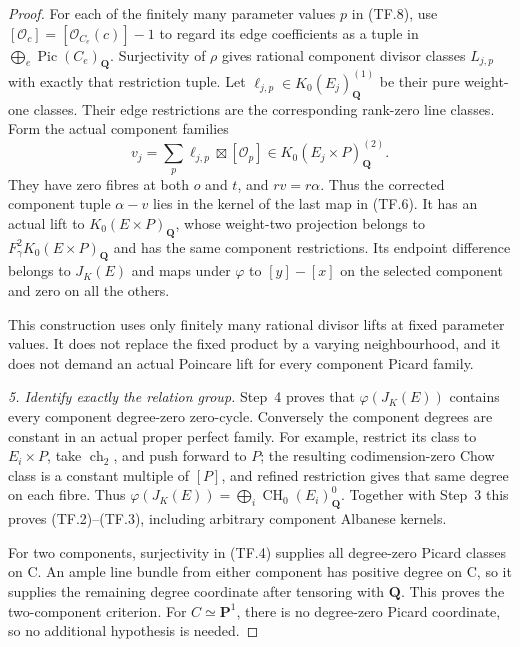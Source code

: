 \begin{proof}
For each of the finitely many parameter values $p$ in (TF.8), use
$[\mathcal O_c]=[\mathcal O_{C_e}(c)]-1$ to regard its edge
coefficients as a tuple in $\bigoplus_e\operatorname{Pic}(C_e)_{\mathbf Q}$.
Surjectivity of $\rho$ gives rational component divisor classes
$L_{j,p}$ with exactly that restriction tuple.
Let $\ell_{j,p}\in K_0(E_j)_{\mathbf Q}^{(1)}$ be their pure
weight-one classes. Their edge restrictions are the corresponding
rank-zero line classes. Form the actual component families
\begin{equation}
 v_j=\sum_p\ell_{j,p}\boxtimes[\mathcal O_p]
            \in K_0(E_j\times P)_{\mathbf Q}^{(2)}.      \tag{TF.9}
\end{equation}
They have zero fibres at both $o$ and $t$, and $rv=r\alpha$.
Thus the corrected component tuple $\alpha-v$ lies in the kernel
of the last map in (TF.6). It has an actual lift to
$K_0(E\times P)_{\mathbf Q}$, whose weight-two projection belongs
to $F_\gamma^2K_0(E\times P)_{\mathbf Q}$ and has the same component
restrictions. Its endpoint difference belongs to $J_K(E)$ and maps
under $\varphi$ to $[y]-[x]$ on the selected component and zero
on all the others.

This construction uses only finitely many rational divisor lifts
at fixed parameter values. It does not replace the fixed product
by a varying neighbourhood, and it does not demand an actual
Poincare lift for every component Picard family.

\emph{5. Identify exactly the relation group.}
Step~4 proves that $\varphi(J_K(E))$ contains every component
degree-zero zero-cycle. Conversely the component degrees are
constant in an actual proper perfect family. For example, restrict
its class to $E_i\times P$, take $\operatorname{ch}_2$, and push
forward to $P$; the resulting codimension-zero Chow class is a
constant multiple of $[P]$, and refined restriction gives that same
degree on each fibre. Thus
$\varphi(J_K(E))=\bigoplus_i\operatorname{CH}_0(E_i)^0_{\mathbf Q}$.
Together with Step~3 this proves (TF.2)--(TF.3), including arbitrary
component Albanese kernels.

For two components, surjectivity in (TF.4) supplies all degree-zero
Picard classes on C. An ample line bundle from either component has
positive degree on C, so it supplies the remaining degree coordinate
after tensoring with $\mathbf Q$. This proves the two-component
criterion. For $C\simeq\mathbf P^1$, there is no degree-zero Picard
coordinate, so no additional hypothesis is needed.


\end{proof}
